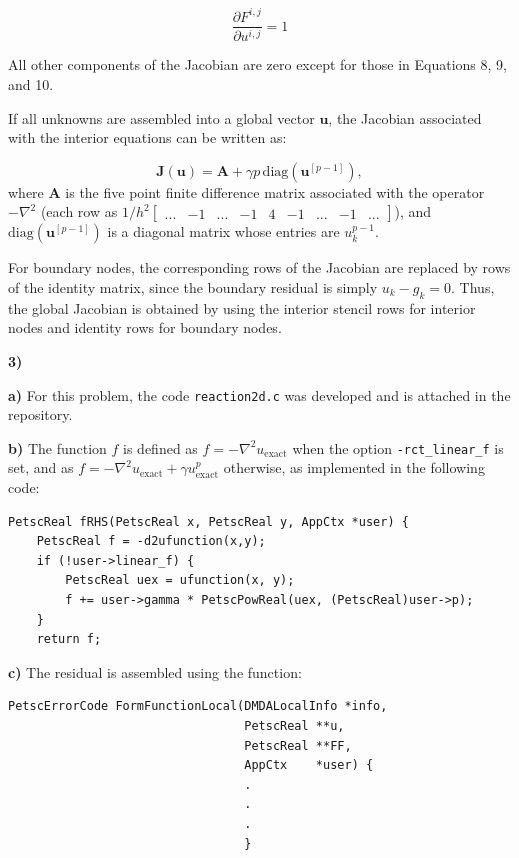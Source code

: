 \documentclass[12pt]{article}
\begin{document}
\begin{equation}
    \frac{\partial F^{i,j}}{\partial u^{i,j}} = 1
\end{equation}

All other components of the Jacobian are zero except for those in Equations 8, 9, and 10.

If all unknowns are assembled into a global vector $\mathbf{u}$, the Jacobian associated with the interior equations can be written as:

\begin{equation}
\mathbf{J}(\mathbf{u}) = \mathbf{A} + \gamma p \, \mathrm{diag}\!\left(\mathbf{u}^{[p-1]}\right),
\end{equation}
where $\mathbf{A}$ is the five point finite difference matrix associated with the operator $-\nabla^2$ (each row as $1/h^2\begin{bmatrix} ...& -1 & ...&-1&4&-1&...&-1&...
    \end{bmatrix} $), and $\mathrm{diag}(\mathbf{u}^{[p-1]})$ is a diagonal matrix whose entries are $u_k^{p-1}$.

For boundary nodes, the corresponding rows of the Jacobian are replaced by rows of the identity matrix, since the boundary residual is simply $u_k-g_k=0$.
Thus, the global Jacobian is obtained by using the interior stencil rows for interior nodes and identity rows for boundary nodes.

\textbf{3)} 

\textbf{ a)} For this problem, the code \texttt{reaction2d.c} was developed and is attached in the repository.

\textbf{ b)} The function $f$ is defined as $f = -\nabla^2 u_{\text{exact}}$ when the option \texttt{-rct\_linear\_f} is set, and as $f = -\nabla^2 u_{\text{exact}} + \gamma u_{\text{exact}}^p$ otherwise, as implemented in the following code:

\begin{lstlisting}
PetscReal fRHS(PetscReal x, PetscReal y, AppCtx *user) {
    PetscReal f = -d2ufunction(x,y);
    if (!user->linear_f) {
        PetscReal uex = ufunction(x, y);
        f += user->gamma * PetscPowReal(uex, (PetscReal)user->p);
    }
    return f;
\end{lstlisting}

\textbf{ c)} The residual is assembled using the function:
\begin{lstlisting}
PetscErrorCode FormFunctionLocal(DMDALocalInfo *info,
                                 PetscReal **u,
                                 PetscReal **FF,
                                 AppCtx    *user) {
                                 .
                                 .
                                 .
                                 }
\end{lstlisting}
\end{document}
